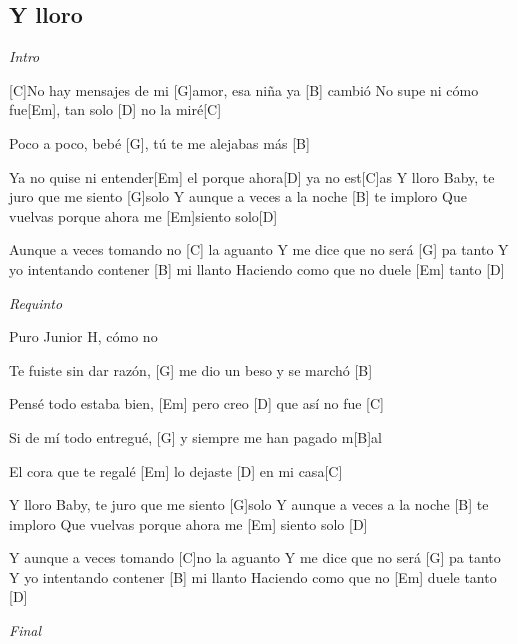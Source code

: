 \subsection{Y lloro}

\noindent
\vspace{1cm}

\begin{guitar}
	\begin{multicols}{2}
		\textit{Intro}


		[C]No hay mensajes de mi [G]amor, esa niña ya [B] cambió
		No supe ni cómo fue[Em], tan solo [D] no la miré[C] \par
		Poco a poco, bebé [G], tú te me alejabas más [B] \par
		Ya no quise ni entender[Em] el porque ahora[D] ya no est[C]as
		Y lloro
		Baby, te juro que me siento [G]solo
		Y aunque a veces a la noche [B] te imploro
		Que vuelvas porque ahora me [Em]siento solo[D] \par
		Aunque a veces tomando no [C] la aguanto
		Y me dice que no será [G] pa tanto
		Y yo intentando contener [B] mi llanto
		Haciendo como que no duele [Em] tanto [D] \par
		\par
		\textit{Requinto}
		\par
		Puro Junior H, cómo no 
		\par
		[C]Te fuiste sin dar razón, [G] me dio un beso y se marchó [B] \par
		Pensé todo estaba bien, [Em] pero creo [D] que así no fue [C] \par
		Si de mí todo entregué, [G] y siempre me han pagado m[B]al  \par
		El cora que te regalé [Em] lo dejaste [D] en mi casa[C] \par
		Y lloro
		Baby, te juro que me siento [G]solo
		Y aunque a veces a la noche [B] te imploro
		Que vuelvas porque ahora me [Em] siento solo [D] \par
		Y aunque a veces tomando [C]no la aguanto
		Y me dice que no será [G] pa tanto
		Y yo intentando contener [B] mi llanto
		Haciendo como que no [Em] duele tanto [D] \par
		\par
		\textit{Final}
	\end{multicols}
\end{guitar}
